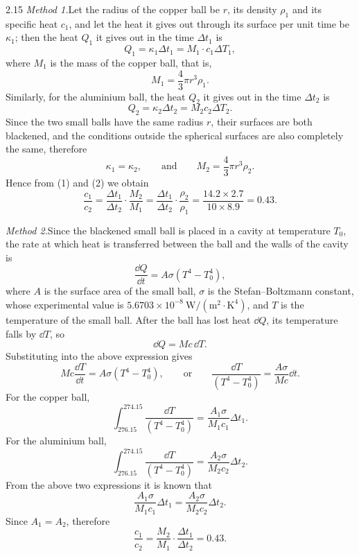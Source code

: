 \begin{solution}{2.15}
\textit{Method 1.}\quad Let the radius of the copper ball be $r$, its density $\rho_1$ and its specific heat $c_1$, and let the heat it gives out through its surface per unit time be $\kappa_1$; then the heat $Q_1$ it gives out in the time $\Delta t_1$ is
\begin{equation}
Q_1=\kappa_1\Delta t_1=M_1\cdot c_1\Delta T_1, \tag{1}
\end{equation}
where $M_1$ is the mass of the copper ball, that is,
\[
M_1=\frac{4}{3}\pi r^3\rho_1.
\]
Similarly, for the aluminium ball, the heat $Q_2$ it gives out in the time $\Delta t_2$ is
\begin{equation}
Q_2=\kappa_2\Delta t_2=M_2c_2\Delta T_2. \tag{2}
\end{equation}
Since the two small balls have the same radius $r$, their surfaces are both blackened, and the conditions outside the spherical surfaces are also completely the same, therefore
\[
\kappa_1=\kappa_2,\qquad\text{and}\qquad M_2=\frac{4}{3}\pi r^3\rho_2.
\]
Hence from (1) and (2) we obtain
\[
\frac{c_1}{c_2}=\frac{\Delta t_1}{\Delta t_2}\cdot\frac{M_2}{M_1}
=\frac{\Delta t_1}{\Delta t_2}\cdot\frac{\rho_2}{\rho_1}
=\frac{14.2\times2.7}{10\times8.9}=0.43.
\]

\textit{Method 2.}\quad Since the blackened small ball is placed in a cavity at temperature $T_0$, the rate at which heat is transferred between the ball and the walls of the cavity is
\[
\frac{\dd Q}{\dd t}=A\sigma(T^4-T_0^4),
\]
where $A$ is the surface area of the small ball, $\sigma$ is the Stefan--Boltzmann constant, whose experimental value is $5.6703\times10^{-8}\ \mathrm{W/(m^2\cdot K^4)}$, and $T$ is the temperature of the small ball. After the ball has lost heat $\dd Q$, its temperature falls by $\dd T$, so
\[
\dd Q=Mc\,\dd T.
\]
Substituting into the above expression gives
\[
Mc\frac{\dd T}{\dd t}=A\sigma(T^4-T_0^4),
\qquad\text{or}\qquad
\frac{\dd T}{(T^4-T_0^4)}=\frac{A\sigma}{Mc}\dd t.
\]
For the copper ball,
\[
\int_{276.15}^{274.15}\frac{\dd T}{(T^4-T_0^4)}=\frac{A_1\sigma}{M_1c_1}\Delta t_1.
\]
For the aluminium ball,
\[
\int_{276.15}^{274.15}\frac{\dd T}{(T^4-T_0^4)}=\frac{A_2\sigma}{M_2c_2}\Delta t_2.
\]
From the above two expressions it is known that
\[
\frac{A_1\sigma}{M_1c_1}\Delta t_1=\frac{A_2\sigma}{M_2c_2}\Delta t_2.
\]
Since $A_1=A_2$, therefore
\[
\frac{c_1}{c_2}=\frac{M_2}{M_1}\cdot\frac{\Delta t_1}{\Delta t_2}=0.43.
\]
\end{solution}

